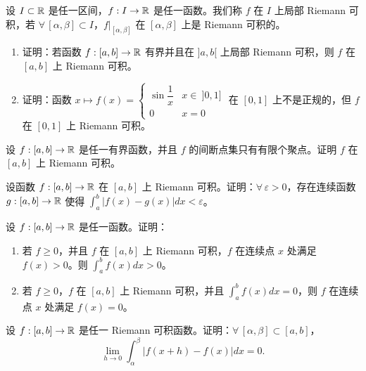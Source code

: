 \begin{exercise}
	\item 设 \(I\subset\mathbb{R}\) 是任一区间，\(f:I\to\mathbb{R}\) 是任一函数。我们称 \(f\) 在 \(I\) 上局部 Riemann 可积，若 \(\forall\,[\alpha,\beta]\subset I\)，\(f|_{[\alpha,\beta]}\) 在 \([\alpha,\beta]\) 上是 Riemann 可积的。
	\begin{enumerate}[label=\arabic*)]
		\item 证明：若函数 \(f:[a,b]\to\mathbb{R}\) 有界并且在 \(]a,b[\) 上局部 Riemann 可积，则 \(f\) 在 \([a,b]\) 上 Riemann 可积。
		\item 证明：函数 \(x\longmapsto f(x)=\begin{cases} \sin\dfrac1x & x\in\ ]0,1] \\ 0 & x=0 \end{cases}\) 在 \([0,1]\) 上不是正规的，但 \(f\) 在 \([0,1]\) 上 Riemann 可积。
	\end{enumerate}
\end{exercise}

\begin{exercise}
	\item 设 \(f:[a,b]\to\mathbb{R}\) 是任一有界函数，并且 \(f\) 的间断点集只有有限个聚点。证明 \(f\) 在 \([a,b]\) 上 Riemann 可积。
\end{exercise}

\begin{exercise}
	\item 设函数 \(f:[a,b]\to\mathbb{R}\) 在 \([a,b]\) 上 Riemann 可积。证明：\(\forall\,\varepsilon>0\)，存在连续函数 \(g:[a,b]\to\mathbb{R}\) 使得 \(\displaystyle\int_a^b|f(x)-g(x)|dx<\varepsilon\)。
\end{exercise}

\begin{exercise}
	\item 设 \(f:[a,b]\to\mathbb{R}\) 是任一函数。证明：
	\begin{enumerate}[label=\arabic*)]
		\item 若 \(f\ge0\)，并且 \(f\) 在 \([a,b]\) 上 Riemann 可积，\(f\) 在连续点 \(x\) 处满足 \(f(x)>0\)。则 \(\displaystyle\int_a^b f(x)dx>0\)。
		\item 若 \(f\ge0\)，\(f\) 在 \([a,b]\) 上 Riemann 可积，并且 \(\displaystyle\int_a^b f(x)dx=0\)，则 \(f\) 在连续点 \(x\) 处满足 \(f(x)=0\)。
	\end{enumerate}
\end{exercise}

\begin{exercise}
	\item 设 \(f:[a,b]\to\mathbb{R}\) 是任一 Riemann 可积函数。证明：\(\forall\,[\alpha,\beta]\subset[a,b]\)，
	\[
	\lim_{h\to0}\int_\alpha^\beta|f(x+h)-f(x)|dx=0.
	\]
\end{exercise}

